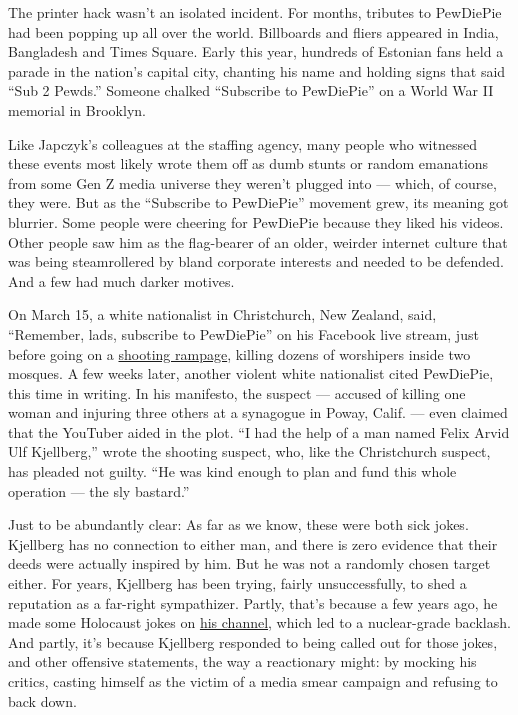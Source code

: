 The printer hack wasn't an isolated incident. For months, tributes to
PewDiePie had been popping up all over the world. Billboards and fliers
appeared in India, Bangladesh and Times Square. Early this year,
hundreds of Estonian fans held a parade in the nation's capital city,
chanting his name and holding signs that said ``Sub 2 Pewds.'' Someone
chalked ``Subscribe to PewDiePie'' on a World War II memorial in
Brooklyn.

Like Japczyk's colleagues at the staffing agency, many people who
witnessed these events most likely wrote them off as dumb stunts or
random emanations from some Gen Z media universe they weren't plugged
into --- which, of course, they were. But as the ``Subscribe to
PewDiePie'' movement grew, its meaning got blurrier. Some people were
cheering for PewDiePie because they liked his videos. Other people saw
him as the flag-bearer of an older, weirder internet culture that was
being steamrollered by bland corporate interests and needed to be
defended. And a few had much darker motives.

On March 15, a white nationalist in Christchurch, New Zealand, said,
``Remember, lads, subscribe to PewDiePie'' on his Facebook live stream,
just before going on a
\href{https://www.nytimes3xbfgragh.onion/2019/03/15/technology/pewdiepie-new-zealand-shooting.html}{shooting
rampage}, killing dozens of worshipers inside two mosques. A few weeks
later, another violent white nationalist cited PewDiePie, this time in
writing. In his manifesto, the suspect --- accused of killing one woman
and injuring three others at a synagogue in Poway, Calif. --- even
claimed that the YouTuber aided in the plot. ``I had the help of a man
named Felix Arvid Ulf Kjellberg,'' wrote the shooting suspect, who, like
the Christchurch suspect, has pleaded not guilty. ``He was kind enough
to plan and fund this whole operation --- the sly bastard.''

Just to be abundantly clear: As far as we know, these were both sick
jokes. Kjellberg has no connection to either man, and there is zero
evidence that their deeds were actually inspired by him. But he was not
a randomly chosen target either. For years, Kjellberg has been trying,
fairly unsuccessfully, to shed a reputation as a far-right sympathizer.
Partly, that's because a few years ago, he made some Holocaust jokes on
\href{https://www.youtube.com/channel/UC-lHJZR3Gqxm24_Vd_AJ5Yw}{his
channel}, which led to a nuclear-grade backlash. And partly, it's
because Kjellberg responded to being called out for those jokes, and
other offensive statements, the way a reactionary might: by mocking his
critics, casting himself as the victim of a media smear campaign and
refusing to back down.

